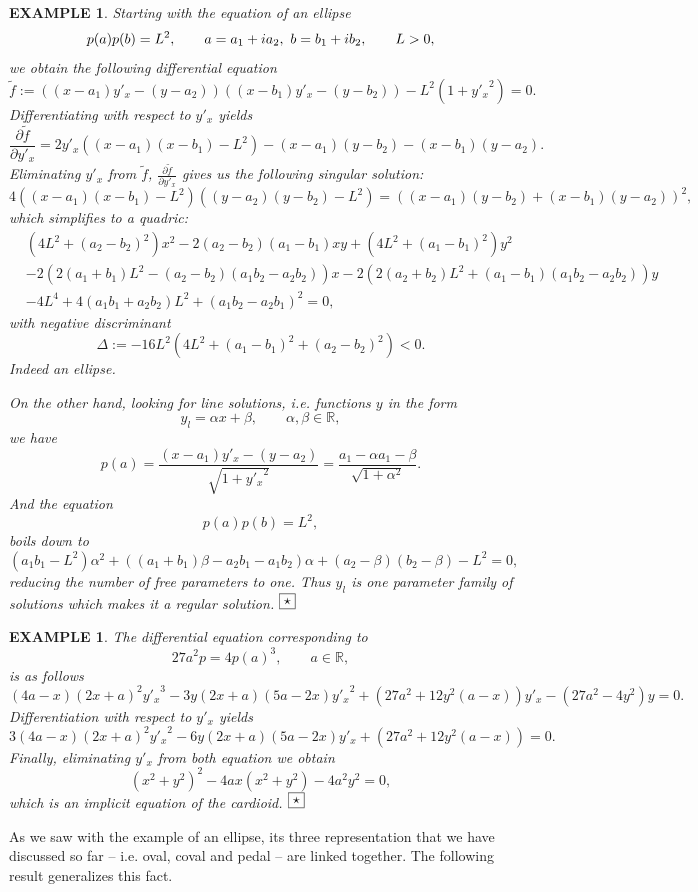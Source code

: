 \documentclass[10pt,a4paper,reqno]{amsart}
\newtheorem{exa}[defi]{\bf E\scriptsize XAMPLE \normalsize}
\def\kopr{\hfill\raisebox{3pt}{\framebox{$\star$}}}
\newenvironment{example}{\begin{exa}\rm}{$\kopr$\end{exa}}
\newcommand{\zav}[1]{\left( #1 \right)}
\newcommand{\imag}{{\rm i}}
\begin{document}
\begin{example}
Starting with the equation of an ellipse
$$
p(a)p(b)=L^2,\qquad a=a_1+\imag a_2,\ b=b_1+\imag b_2,\qquad L>0,
$$
we obtain the following differential equation
$$
\tilde f:=\zav{(x-a_1)y'_x-(y-a_2)}\zav{(x-b_1)y'_x-(y-b_2)}-L^2\zav{1+{y'_x}^2}=0.
$$
Differentiating with respect to $y'_x$ yields
$$
\frac{\partial \tilde f}{\partial y'_x}= 2y'_x\zav{(x-a_1)(x-b_1)-L^2}-(x-a_1)(y-b_2)-(x-b_1)(y-a_2).
$$
Eliminating $y'_x$ from $\tilde f$, $\frac{\partial \tilde f}{\partial y'_x}$ gives us the following singular solution:
$$
4\zav{(x-a_1)(x-b_1)-L^2}\zav{(y-a_2)(y-b_2)-L^2}=\zav{(x-a_1)(y-b_2)+(x-b_1)(y-a_2)}^2,
$$
which simplifies to a quadric:
\begin{align*}
&\zav{4L^2+(a_2-b_2)^2}x^2-2(a_2-b_2)(a_1-b_1)xy+\zav{4L^2+(a_1-b_1)^2}y^2\\
&-2\zav{2(a_1+b_1)L^2-(a_2-b_2)(a_1b_2-a_2b_2)}x
-2\zav{2(a_2+b_2)L^2+(a_1-b_1)(a_1b_2-a_2b_2)}y\\
&-4L^4+4(a_1b_1+a_2b_2)L^2+(a_1b_2-a_2b_1)^2=0,
\end{align*}
with negative discriminant
$$
\Delta:=-16L^2\zav{4L^2+(a_1-b_1)^2+(a_2-b_2)^2}< 0.
$$
Indeed an ellipse.
\bigskip

On the other hand, looking for line solutions, i.e. functions $y$ in the form
$$
y_l=\alpha x+\beta,\qquad \alpha,\beta\in\mathbb{R},
$$
we have
$$
p(a)=\frac{(x-a_1)y'_x-(y-a_2)}{\sqrt{1+{y'_x}^2}}=\frac{a_1-\alpha a_1-\beta}{\sqrt{1+\alpha^2}}.
$$
And the equation
$$
p(a)p(b)=L^2,
$$
boils down to
$$
(a_1b_1-L^2)\alpha^2+((a_1+b_1)\beta-a_2b_1-a_1b_2)\alpha+(a_2-\beta)(b_2-\beta)-L^2=0,
$$
reducing the number of free parameters to one. Thus $y_l$ is one parameter family of solutions which makes it a \textit{regular} solution.
\end{example}
\begin{example}
The differential equation corresponding to
$$
27a^2p=4p(a)^3,\qquad a\in\mathbb{R},
$$
is as follows
$$
(4a-x)(2x+a)^2 {y'_x}^3-3y(2x+a)(5a-2x){y'_x}^2+(27 a^2+12 y^2(a-x))y'_x-(27a^2-4y^2)y=0.
$$
Differentiation with respect to $y'_x$ yields
$$
3(4a-x)(2x+a)^2 {y'_x}^2-6y(2x+a)(5a-2x){y'_x}+(27 a^2+12 y^2(a-x))=0.
$$
Finally, eliminating $y'_x$ from both equation we obtain
$$
(x^2+y^2)^2-4ax(x^2+y^2)-4a^2y^2=0,
$$
which is an implicit equation of the cardioid.
\end{example}
As we saw with the example of an ellipse, its three representation that we have discussed so far -- i.e. oval, coval and pedal -- are linked together. The following result generalizes this fact.
\end{document}
